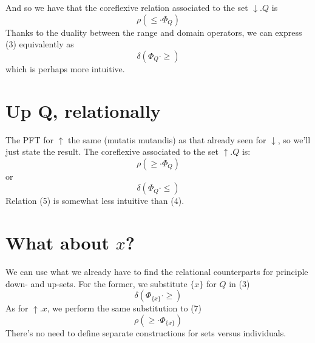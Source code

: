 \documentclass{article}
\begin{document}
And so we have that the coreflexive relation associated to the set $\downarrow.Q$ is
\begin{equation}
    \rho(\leq \cdot \Phi_{Q})
\end{equation}
Thanks to the duality between the range and domain operators, we can express (3) equivalently as
\begin{equation}
    \delta(\Phi_{Q} \cdot \geq)
\end{equation}
which is perhaps more intuitive.

\section{Up Q, relationally}
The PFT for $\uparrow$ the same (mutatis mutandis) as that already seen for $\downarrow$, so we'll just state the result.  The coreflexive associated to the set $\uparrow.Q$ is:
\begin{equation}
    \rho(\geq \cdot \Phi_{Q})
\end{equation}
or
\begin{equation}
    \delta(\Phi_{Q} \cdot \leq)
\end{equation}
Relation (5) is somewhat less intuitive than (4).

\section{What about $x$?}
We can use what we already have to find the relational counterparts for principle down- and up-sets.  For the former, we substitute $\{x\}$ for $Q$ in (3)
\begin{equation}
    \delta(\Phi_{\{x\}} \cdot \geq)
\end{equation}
As for $\uparrow.x$, we perform the same substitution to (7)
\begin{equation}
    \rho(\geq \cdot \Phi_{\{x\}})
\end{equation}
There's no need to define separate constructions for sets versus individuals.



\end{document}
